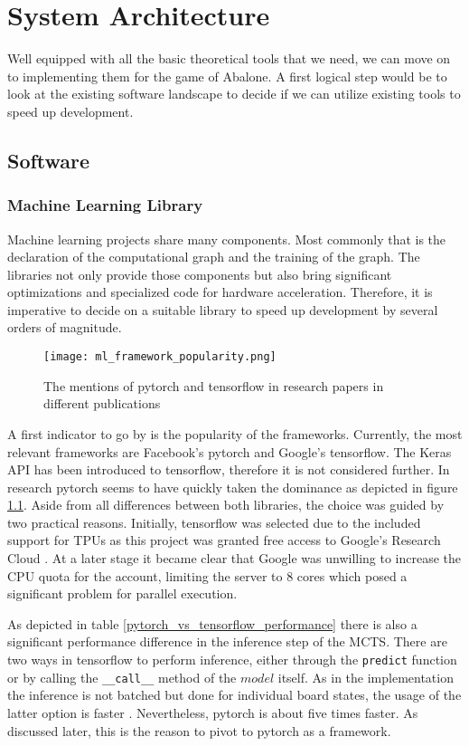 \chapter{System Architecture}
Well equipped with all the basic theoretical tools that we need, we can move on to implementing them for the game of Abalone. A first logical step would be to look at the existing software landscape to decide if we can utilize existing tools to speed up development.

\section{Software}
\subsection{Machine Learning Library}
Machine learning projects share many components. Most commonly that is the declaration of the computational graph and the training of the graph. The libraries not only provide those components but also bring significant optimizations and specialized code for hardware acceleration. Therefore, it is imperative to decide on a suitable library to speed up development by several orders of magnitude.

\begin{figure}
    \centering
    \texttt{[image: ml\_framework\_popularity.png]}
    \caption{The mentions of pytorch and tensorflow in research papers in different publications \cite{noauthor_state_2019}}
    \label{ml_framework_popularity}
\end{figure}

A first indicator to go by is the popularity of the frameworks. Currently, the most relevant frameworks are Facebook's pytorch and Google's tensorflow. The Keras API has been introduced to tensorflow, therefore it is not considered further. In research pytorch seems to have quickly taken the dominance as depicted in figure \ref{ml_framework_popularity}. Aside from all differences between both libraries, the choice was guided by two practical reasons. Initially, tensorflow was selected due to the included support for TPUs as this project was granted free access to Google's Research Cloud \cite{noauthor_tpu_nodate}. At a later stage it became clear that Google was unwilling to increase the CPU quota for the account, limiting the server to 8 cores which posed a significant problem for parallel execution.

As depicted in table \ref{pytorch_vs_tensorflow_performance} there is also a significant performance difference in the inference step of the MCTS. There are two ways in tensorflow to perform inference, either through the \texttt{predict} function or by calling the \texttt{\_\_call\_\_} method of the $model$ itself. As in the implementation the inference is not batched but done for individual board states, the usage of the latter option is faster \cite{noauthor_tfkerasmodel_nodate}. Nevertheless, pytorch is about five times faster. As discussed later, this is the reason to pivot to pytorch as a framework.

